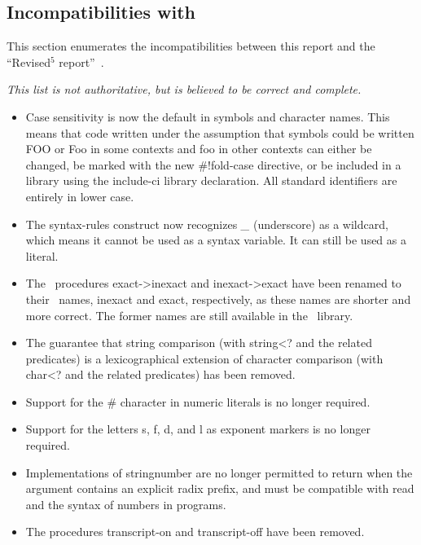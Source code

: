 

\subsection*{Incompatibilities with \rfivers}
\label{incompatibilities}

This section enumerates the incompatibilities between this report and
the ``Revised$^5$ report''~\cite{R5RS}.

{\em This list is not authoritative, but is believed to be correct and complete.}


\begin{itemize}

\item Case sensitivity is now the default in symbols and character names.
This means that code written under the assumption that symbols could be
written {\cf FOO} or {\cf Foo} in some contexts and {\cf foo} in other contexts
can either be changed, be marked with the new {\cf \#!fold-case} directive,
or be included in a library using the {\cf include-ci} library declaration.
All standard identifiers are entirely in lower case.

\item The {\cf syntax-rules} construct now recognizes {\em \_} (underscore) 
as a wildcard, which means it cannot be used as a syntax variable.
It can still be used as a literal.

\item The \rfivers\ procedures {\cf exact->inexact} and {\cf inexact->exact}
have been renamed to their \rsixrs\ names, {\cf inexact} and {\cf exact},
respectively, as these names are shorter and more correct.
The former names are still available in the \rfivers\ library.

\item The guarantee that string comparison (with {\cf string<?} and the
related predicates) is a lexicographical extension of character comparison
(with {\cf char<?} and the related predicates) has been removed.  

\item Support for the \# character in numeric literals is no longer required.

\item Support for the letters {\cf s}, {\cf f}, {\cf d}, and {\cf l}
as exponent markers is no longer required.

\item Implementations of {\cf string\coerce{}number} are no longer permitted
to return \schfalse{} when the argument contains an explicit radix prefix,
and must be compatible with {\cf read} and the syntax of numbers in programs.

\item The procedures {\cf transcript-on} and {\cf transcript-off} have been removed.

\end{itemize}

